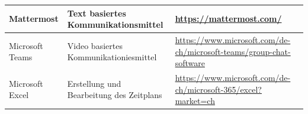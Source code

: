 \begin{longtable}{|p{}|p{}|p{}|}
    Mattermost                       & Text basiertes Kommunikationsmittel                & \url{https://mattermost.com/}                                             \\ \hline
    Microsoft Teams                  & Video basiertes Kommunikationiesmittel             & \url{https://www.microsoft.com/de-ch/microsoft-teams/group-chat-software} \\ \hline
    Microsoft Excel                  & Erstellung und Bearbeitung des Zeitplans           & \url{https://www.microsoft.com/de-ch/microsoft-365/excel?market=ch}       \\ \hline
\end{longtable}
\renewcommand{\arraystretch}{1}
\newpage